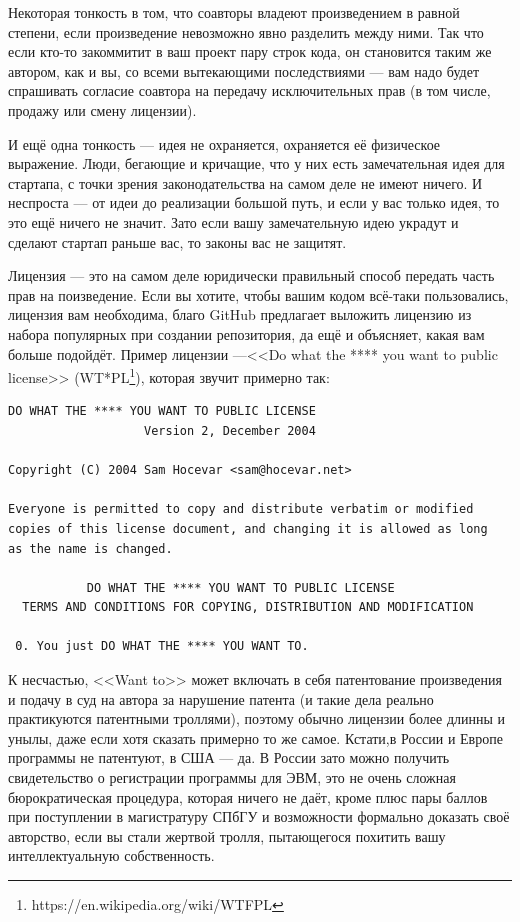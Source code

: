 \documentclass[a5paper]{article}
\begin{document}
Некоторая тонкость в том, что соавторы владеют произведением в равной степени, если произведение невозможно явно разделить между ними. Так что если кто-то закоммитит в ваш проект пару строк кода, он становится таким же автором, как и вы, со всеми вытекающими последствиями --- вам надо будет спрашивать согласие соавтора на передачу исключительных прав (в том числе, продажу или смену лицензии).

И ещё одна тонкость --- идея не охраняется, охраняется её физическое выражение. Люди, бегающие и кричащие, что у них есть замечательная идея для стартапа, с точки зрения законодательства на самом деле не имеют ничего. И неспроста --- от идеи до реализации большой путь, и если у вас только идея, то это ещё ничего не значит. Зато если вашу замечательную идею украдут и сделают стартап раньше вас, то законы вас не защитят.

Лицензия --- это на самом деле юридически правильный способ передать часть прав на поизведение. Если вы хотите, чтобы вашим кодом всё-таки пользовались, лицензия вам необходима, благо GitHub предлагает выложить лицензию из набора популярных при создании репозитория, да ещё и объясняет, какая вам больше подойдёт. Пример лицензии ---<<Do what the **** you want to public license>> (WT*PL\footnote{https://en.wikipedia.org/wiki/WTFPL}), которая звучит примерно так:
\begin{verbatim}
DO WHAT THE **** YOU WANT TO PUBLIC LICENSE
                   Version 2, December 2004
 
Copyright (C) 2004 Sam Hocevar <sam@hocevar.net>

Everyone is permitted to copy and distribute verbatim or modified
copies of this license document, and changing it is allowed as long
as the name is changed.
 
           DO WHAT THE **** YOU WANT TO PUBLIC LICENSE
  TERMS AND CONDITIONS FOR COPYING, DISTRIBUTION AND MODIFICATION

 0. You just DO WHAT THE **** YOU WANT TO.
 \end{verbatim}

К несчастью, <<Want to>> может включать в себя патентование произведения и подачу в суд на автора за нарушение патента (и такие дела реально практикуются патентными троллями), поэтому обычно лицензии более длинны и унылы, даже если хотя сказать примерно то же самое. Кстати,в России и Европе программы не патентуют, в США --- да. В России зато можно получить свидетельство о регистрации программы для ЭВМ, это не очень сложная бюрократическая процедура, которая ничего не даёт, кроме плюс пары баллов при поступлении в магистратуру СПбГУ и возможности формально доказать своё авторство, если вы стали жертвой тролля, пытающегося похитить вашу интеллектуальную собственность.
\end{document}
